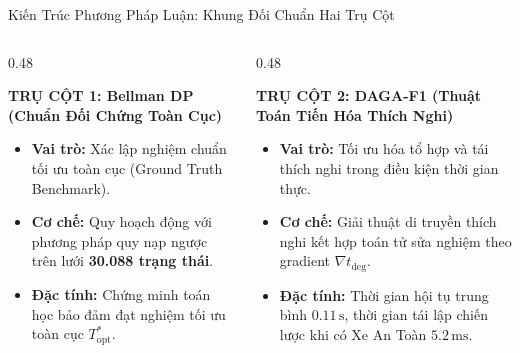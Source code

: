 \documentclass[aspectratio=169, 10pt]{beamer}
\begin{document}
\begin{frame}{Kiến Trúc Phương Pháp Luận: Khung Đối Chuẩn Hai Trụ Cột}
  \begin{columns}[T]
    \begin{column}{0.48\textwidth}
      \begin{block}{\centering \textbf{TRỤ CỘT 1: Bellman DP (Chuẩn Đối Chứng Toàn Cục)}}
        \scriptsize
        \begin{itemize}
          \item \textbf{Vai trò:} Xác lập nghiệm chuẩn tối ưu toàn cục (Ground Truth Benchmark).
          \item \textbf{Cơ chế:} Quy hoạch động với phương pháp quy nạp ngược trên lưới \textbf{30.088 trạng thái}.
          \item \textbf{Đặc tính:} Chứng minh toán học bảo đảm đạt nghiệm tối ưu toàn cục $T_{\text{opt}}^*$.
        \end{itemize}
      \end{block}
    \end{column}

    \begin{column}{0.48\textwidth}
      \begin{exampleblock}{\centering \textbf{TRỤ CỘT 2: DAGA-F1 (Thuật Toán Tiến Hóa Thích Nghi)}}
        \scriptsize
        \begin{itemize}
          \item \textbf{Vai trò:} Tối ưu hóa tổ hợp và tái thích nghi trong điều kiện thời gian thực.
          \item \textbf{Cơ chế:} Giải thuật di truyền thích nghi kết hợp toán tử sửa nghiệm theo gradient $\nabla t_{\text{deg}}$.
          \item \textbf{Đặc tính:} Thời gian hội tụ trung bình \textbf{$0.11\,\text{s}$}, thời gian tái lập chiến lược khi có Xe An Toàn \textbf{$5.2\,\text{ms}$}.
        \end{itemize}
      \end{exampleblock}
    \end{column}
  \end{columns}

  \vspace{0.1cm}
  \begin{center}
\end{center}
\end{frame}
\end{document}
